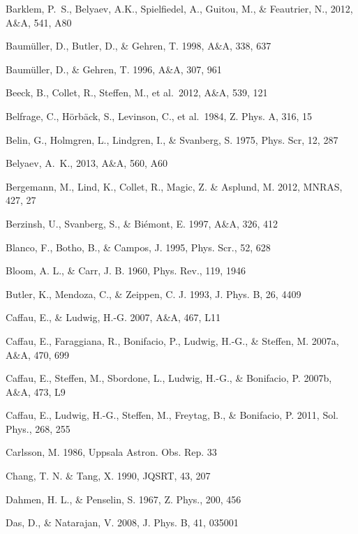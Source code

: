 \documentclass[traditabstract]{aa}
\begin{document}
\begin{thebibliography}{}
  Barklem, P.~S., Belyaev, A.K., Spielfiedel, A., Guitou, M., \& Feautrier, N., 2012, A\&A, 541, A80

  Baum\"uller, D., Butler, D., \& Gehren, T. 1998, A\&A, 338, 637

  Baum\"uller, D., \& Gehren, T. 1996, A\&A, 307, 961
 
  Beeck, B., Collet, R., Steffen, M., et al.\ 2012, A\&A, 539, 121

  Belfrage, C., H\"orb\"ack, S., Levinson, C., et al.\ 1984, Z. Phys. A, 316, 15

  Belin, G., Holmgren, L., Lindgren, I., \& Svanberg, S. 1975, Phys. Scr, 12, 287

  Belyaev, A.~K., 2013, A\&A, 560, A60
 
  Bergemann, M., Lind, K., Collet, R., Magic, Z. \& Asplund, M. 2012, MNRAS, 427, 27

  Berzinsh, U., Svanberg, S., \& Bi\'emont, E. 1997, A\&A, 326, 412

  Blanco, F., Botho, B., \& Campos, J. 1995, Phys. Scr., 52, 628

  Bloom, A. L., \& Carr, J. B. 1960, Phys. Rev., 119, 1946

  Butler, K., Mendoza, C., \& Zeippen, C. J. 1993, J. Phys. B, 26, 4409

  Caffau, E., \& Ludwig, H.-G. 2007, A\&A, 467, L11

  Caffau, E., Faraggiana, R., Bonifacio, P., Ludwig, H.-G., \& Steffen, M. 2007a, A\&A, 470, 699

  Caffau, E., Steffen, M., Sbordone, L., Ludwig, H.-G., \& Bonifacio, P.  2007b, A\&A, 473, L9

  Caffau, E., Ludwig, H.-G., Steffen, M., Freytag, B., \& Bonifacio, P.  2011, Sol. Phys., 268, 255

  Carlsson, M. 1986, Uppsala Astron. Obs. Rep. 33

  Chang, T. N. \& Tang, X.  1990, JQSRT, 43, 207

  Dahmen, H. L., \& Penselin, S. 1967, Z. Phys., 200, 456

  Das, D., \& Natarajan, V.  2008, J. Phys. B, 41, 035001


\end{thebibliography}
\end{document}
